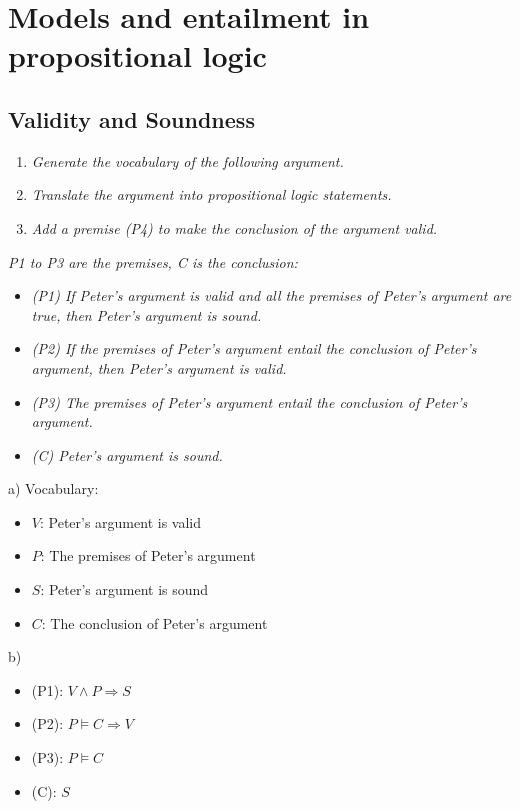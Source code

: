 \section{Models and entailment in propositional logic}

\subsection{Validity and Soundness}

\begin{enumerate}[label=\alph*)]
    \item \textit{Generate the vocabulary of the following argument.}
    \item \textit{Translate the argument into propositional logic statements.}
    \item \textit{Add a premise (P4) to make the conclusion of the argument valid.} 
\end{enumerate}

\textit{P1 to P3 are the premises, C is the conclusion: }

\begin{itemize}
    \item \textit{(P1) If Peter’s argument is valid and all the premises of Peter’s argument are true, then Peter’s
    argument is sound.}
    \item \textit{(P2) If the premises of Peter’s argument entail the conclusion of Peter’s argument, then Peter’s
    argument is valid.}
    \item \textit{(P3) The premises of Peter’s argument entail the conclusion of Peter’s argument.}
    \item \textit{(C) Peter’s argument is sound.}
\end{itemize}

a) Vocabulary: 

\begin{itemize}
    \item $V$: Peter's argument is valid
    \item $P$: The premises of Peter's argument
    \item $S$: Peter's argument is sound
    \item $C$: The conclusion of Peter's argument
\end{itemize}

b) 

\begin{itemize}
    \item (P1): $V \land P \Longrightarrow S$
    \item (P2): $P \models C \Longrightarrow V$
    \item (P3): $P \models C$
    \item (C): $S$
\end{itemize}

